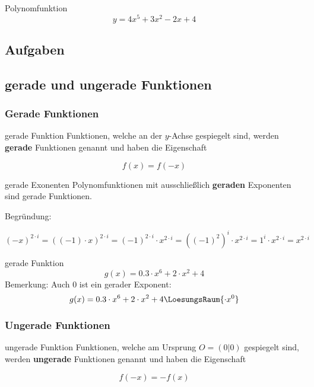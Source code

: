 \begin{beispiel}{Polynomfunktion}{}
  $$y=4x^5 + 3x^2 -2x + 4$$
\end{beispiel}


\subsection*{Aufgaben}
\newpage

\subsection{gerade und ungerade Funktionen}
\subsubsection{Gerade Funktionen}

\begin{definition}{gerade Funktion}{}
  Funktionen, welche an der $y$-Achse gespiegelt sind, werden
  \textbf{gerade} Funktionen genannt und haben die Eigenschaft

  $$f(x) = f(-x)$$
\end{definition}


\begin{gesetz}{gerade Exonenten}{}
  Polynomfunktionen mit ausschließlich \textbf{geraden} Exponenten sind gerade Funktionen.

  Begründung:

  $$(-x)^{2\cdot{}i} = ((-1)\cdot{}x)^{2\cdot{}i} = (-1)^{2\cdot{}i} \cdot{} x^{2\cdot{}i} = \left((-1)^2\right)^i \cdot{} x^{2\cdot{}i} = 1^i\cdot{}x^{2\cdot{}i} = x^{2\cdot{}i}$$
\end{gesetz}

\begin{beispiel}{gerade Funktion}{}
  $$g(x) = 0.3\cdot{}x^6 + 2\cdot{}x^2 + 4$$
  Bemerkung: Auch $0$ ist ein gerader Exponent:
  $$g(x) = 0.3\cdot{}x^6 + 2\cdot{}x^2 + 4\LoesungsRaum{\cdot{}x^0}$$  
\end{beispiel}
\newpage
\subsubsection{Ungerade Funktionen}
\begin{definition}{ungerade Funktion}{}
  Funktionen, welche am Ursprung $O = (0|0)$ gespiegelt sind, werden
  \textbf{ungerade} Funktionen genannt und haben die Eigenschaft

  $$f(-x) = -f(x)$$
\end{definition}




